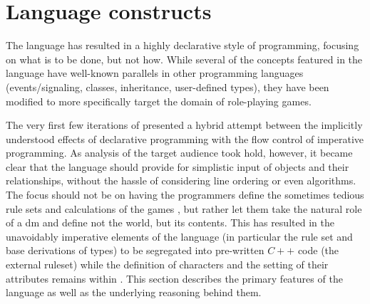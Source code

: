 \section{Language constructs}
The \langname{} language has resulted in a highly declarative style of programming, focusing on what is to be done, but not how. While several of the concepts featured in the language have well-known parallels in other programming languages (events/signaling, classes, inheritance, user-defined types), they have been modified to more specifically target the domain of role-playing games.

The very first few iterations of \langname{} presented a hybrid attempt between the implicitly understood effects of declarative programming with the flow control of imperative programming. As analysis of the target audience took hold, however, it became clear that the language should provide for simplistic input of objects  and their relationships, without the hassle of considering line ordering or even algorithms. The focus should not be on having the programmers define the sometimes tedious rule sets and calculations of the games , but rather let them take the natural role of a \ac{dm} and define not the world, but its contents. This has resulted in the unavoidably imperative elements of the language (in particular the rule set and base derivations of types) to be segregated into pre-written $C++$ code (the external ruleset) while the definition of characters and the setting of their attributes remains within \langname{}. This section  describes the primary features of the \langname{} language as well as the underlying reasoning behind them.
